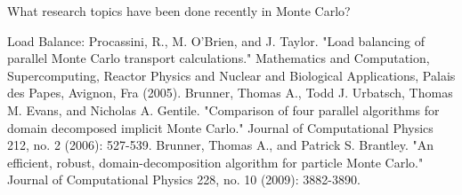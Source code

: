 What research topics have been done recently in Monte Carlo?

%	
%	
%	
	


Load Balance:
	Procassini, R., M. O’Brien, and J. Taylor. "Load balancing of parallel Monte Carlo transport calculations." Mathematics and Computation, Supercomputing, Reactor Physics and Nuclear and Biological Applications, Palais des Papes, Avignon, Fra (2005).
	Brunner, Thomas A., Todd J. Urbatsch, Thomas M. Evans, and Nicholas A. Gentile. "Comparison of four parallel algorithms for domain decomposed implicit Monte Carlo." Journal of Computational Physics 212, no. 2 (2006): 527-539.
	Brunner, Thomas A., and Patrick S. Brantley. "An efficient, robust, domain-decomposition algorithm for particle Monte Carlo." Journal of Computational Physics 228, no. 10 (2009): 3882-3890.
